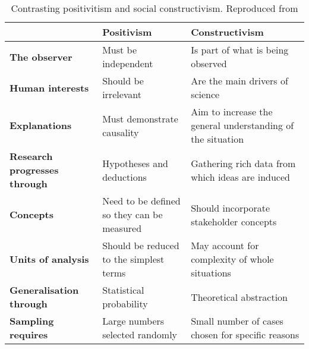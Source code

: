 \begin{table}[]
	\centering
	\caption{Contrasting positivitism and social constructivism. Reproduced from \citep{easterby2015management}}
	\label{epistemology}
	\begin{tabular}{@{}lll@{}}
		\toprule
											& \textbf{Positivism}						 &\textbf{Constructivism}   \\ 
		\midrule
		\textbf{The observer}               & Must be independent                        & Is part of what is being observed                          \\
		\textbf{Human interests}            & Should be irrelevant                       & Are the main drivers of science                            \\
		\textbf{Explanations}               & Must demonstrate causality                 & Aim to increase the general understanding of the situation \\
		\textbf{Research progresses through}& Hypotheses and deductions                  & Gathering rich data from which ideas are induced           \\
		\textbf{Concepts}                   & Need to be defined so they can be measured & Should incorporate stakeholder concepts                    \\
		\textbf{Units of analysis}          & Should be reduced to the simplest terms    & May account for complexity of whole situations             \\
		\textbf{Generalisation through}     & Statistical probability                    & Theoretical abstraction                                    \\
		\textbf{Sampling requires}          & Large numbers selected randomly            & Small number of cases  chosen for specific reasons         \\ \bottomrule
	\end{tabular}
\end{table}



